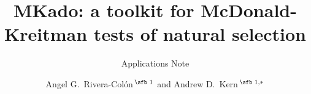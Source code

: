 \documentclass[nocrop]{bioinfo}
\begin{document}

\subtitle{Applications Note}

\title[MKado: McDonald-Kreitman test toolkit]{MKado: a toolkit for McDonald-Kreitman tests of natural selection}
\author[Rivera-Col\'{o}n and Kern]{Angel G.\ Rivera-Col\'{o}n\,$^{\text{\sfb 1}}$ and Andrew D.\ Kern\,$^{\text{\sfb 1,}*}$}
\address{$^{\text{\sf 1}}$Institute of Ecology and Evolution and Department of Biology, University of Oregon, Eugene, OR 97403, USA}


\history{}

\editor{}



\maketitle





\vspace*{-10pt}


\vspace*{-12pt}


\vspace*{-12pt}


\end{document}
